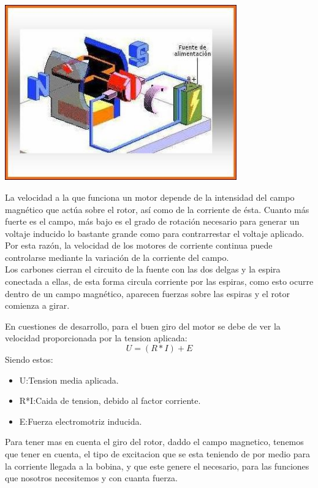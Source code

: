 \documentclass[12pt,a4paper]{article}
\begin{document}
\begin{center}
\includegraphics[width=10cm]{Motor.png}
\end{center}


La velocidad a la que funciona un motor depende de la intensidad del campo magnético que actúa sobre el rotor, así como de la corriente de ésta.
Cuanto más fuerte es el campo, más bajo es el grado de rotación necesario para generar un voltaje inducido lo bastante grande como para contrarrestar el voltaje aplicado. Por esta razón, la velocidad de los motores de corriente continua puede controlarse mediante la variación de la corriente del campo.\\
Los carbones cierran el circuito de la fuente con las dos delgas y la espira conectada a ellas, de esta forma circula corriente por las espiras, como esto ocurre dentro de un campo magnético, aparecen fuerzas sobre las espiras y el rotor comienza a girar.

En cuestiones de desarrollo, para el buen giro del motor se debe de ver la velocidad proporcionada por la tension aplicada:\\
$$ U= (R*I)+E $$
Siendo estos:
\begin{itemize}
\item U:Tension media aplicada.
\item R*I:Caida de tension, debido al factor corriente.
\item E:Fuerza electromotriz inducida.
\end{itemize}

Para tener mas en cuenta el giro del rotor, daddo el campo magnetico, tenemos que tener en cuenta, el tipo de excitacion que se esta teniendo de por medio para la corriente llegada a la bobina, y que este genere el necesario, para las funciones que nosotros necesitemos y con cuanta fuerza.\\
\end{document}

